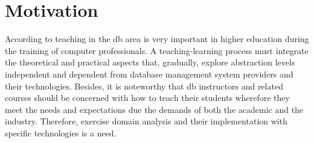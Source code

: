 \section{Motivation}

According to  teaching in the \ac{db} area is very important in higher education during the training of computer professionals.
A teaching-learning process must integrate the theoretical and practical aspects that, gradually, explore abstraction levels independent and dependent from database management system providers and their technologies.
Besides, it is noteworthy that \ac{db} instructors and related courses should be concerned with how to teach their students 
wherefore they meet the needs and expectations due the demands of both the academic and the industry. Therefore, exercise domain analysis and their implementation with specific technologies is a need. 


